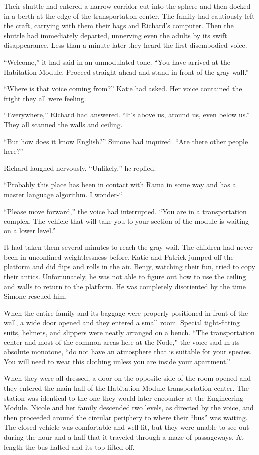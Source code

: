 \documentclass[]{article}
\begin{document}
{Their shuttle had entered a narrow corridor cut into the sphere and then docked in a berth at the edge of the transportation center. The family had cautiously left the craft, carrying with them their bags and Richard’s computer. Then the shuttle had immediately departed, unnerving even the adults by its swift disappearance. Less than a minute later they heard the first disembodied voice.

“Welcome,” it had said in an unmodulated tone. “You have arrived at the Habitation Module. Proceed straight ahead and stand in front of the gray wall.”

“Where is that voice coming from?” Katie had asked. Her voice contained the fright they all were feeling.

“Everywhere,” Richard had answered. “It’s above us, around us, even below us.” They all scanned the walls and ceiling.

“But how does it know English?” Simone had inquired. “Are there other people here?”

Richard laughed nervously. “Unlikely,” he replied.

“Probably this place has been in contact with Rama in some way and has a master language algorithm. I wonder-“

“Please move forward,” the voice had interrupted. “You are in a transportation complex. The vehicle that will take you to your section of the module is waiting on a lower level.”

It had taken them several minutes to reach the gray wail. The children had never been in unconfined weightlessness before. Katie and Patrick jumped off the platform and did flips and rolls in the air. Benjy, watching their fun, tried to copy their antics. Unfortunately, he was not able to figure out how to use the ceiling and walls to return to the platform. He was completely disoriented by the time Simone rescued him.

When the entire family and its baggage were properly positioned in front of the wall, a wide door opened and they entered a small room. Special tight-fitting suits, helmets, and slippers were neatly arranged on a bench. “The transportation center and most of the common areas here at the Node,” the voice said in its absolute monotone, “do not have an atmosphere that is suitable for your species. You will need to wear this clothing unless you are inside your apartment.”

When they were all dressed, a door on the opposite side of the room opened and they entered the main hall of the Habitation Module transportation center. The station was identical to the one they would later encounter at the Engineering Module. Nicole and her family descended two levels, as directed by the voice, and then proceeded around the circular periphery to where their “bus” was waiting. The closed vehicle was comfortable and well lit, but they were unable to see out during the hour and a half that it traveled through a maze of passageways. At length the bus halted and its top lifted off.

}
\end{document}
